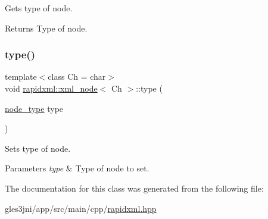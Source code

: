 Gets type of node. \begin{DoxyReturn}{Returns}
Type of node. 
\end{DoxyReturn}
\mbox{\label{classrapidxml_1_1xml__node_a499bbc9300c1b06821d5c08b24164c68}} 
\subsubsection{\texorpdfstring{type()}{type()}\hspace{0.1cm}{\footnotesize\ttfamily [2/2]}}
{\footnotesize\ttfamily template$<$class Ch = char$>$ \\
void \hyperlink{classrapidxml_1_1xml__node}{rapidxml\+::xml\+\_\+node}$<$ Ch $>$\+::type (\begin{DoxyParamCaption}\item[{\hyperlink{rapidxml_8hpp_abb456db38f7efb746c4330eed6072a7c}{node\+\_\+type}}]{type }\end{DoxyParamCaption})\hspace{0.3cm}{\ttfamily [inline]}}

Sets type of node. 
\begin{DoxyParams}{Parameters}
{\em type} & Type of node to set. \\
\hline
\end{DoxyParams}


The documentation for this class was generated from the following file\+:\begin{DoxyCompactItemize}
\item 
gles3jni/app/src/main/cpp/\hyperlink{rapidxml_8hpp}{rapidxml.\+hpp}\end{DoxyCompactItemize}
